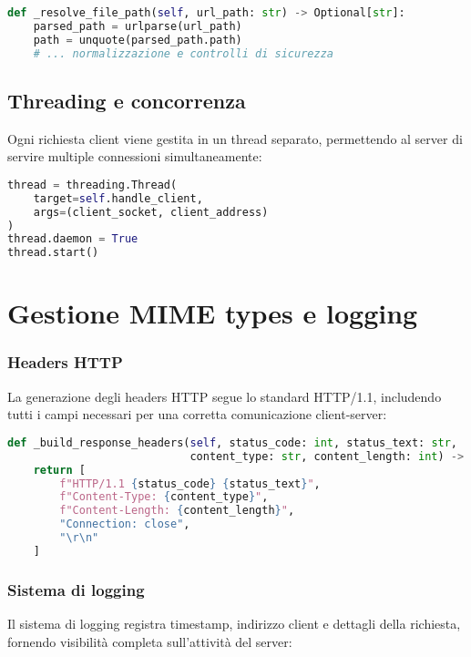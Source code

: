 \documentclass[a4paper,12pt]{report}
\begin{document}
\begin{lstlisting}[language=Python]
def _resolve_file_path(self, url_path: str) -> Optional[str]:
    parsed_path = urlparse(url_path)
    path = unquote(parsed_path.path)
    # ... normalizzazione e controlli di sicurezza
\end{lstlisting}

\subsection{Threading e concorrenza}

Ogni richiesta client viene gestita in un thread separato, permettendo al server di servire multiple connessioni simultaneamente:

\begin{lstlisting}[language=Python]
thread = threading.Thread(
    target=self.handle_client,
    args=(client_socket, client_address)
)
thread.daemon = True
thread.start()
\end{lstlisting}

\section{Gestione MIME types e logging}

\subsubsection{Headers HTTP}

La generazione degli headers HTTP segue lo standard HTTP/1.1, includendo tutti i campi necessari per una corretta comunicazione client-server:

\begin{lstlisting}[language=Python]
def _build_response_headers(self, status_code: int, status_text: str,
                            content_type: str, content_length: int) -> list:
    return [
        f"HTTP/1.1 {status_code} {status_text}",
        f"Content-Type: {content_type}",
        f"Content-Length: {content_length}",
        "Connection: close",
        "\r\n"
    ]
\end{lstlisting}

\subsubsection{Sistema di logging}

Il sistema di logging registra timestamp, indirizzo client e dettagli della richiesta, fornendo visibilità completa sull'attività del server:
\end{document}
